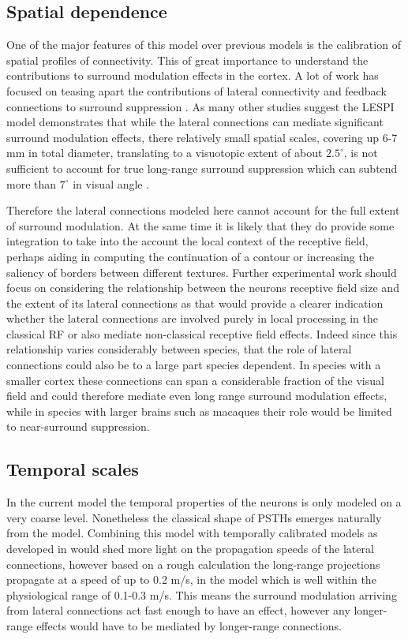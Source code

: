 \subsection{Spatial dependence}

One of the major features of this model over previous models is the
calibration of spatial profiles of connectivity. This of great
importance to understand the contributions to surround modulation
effects in the cortex. A lot of work has focused on teasing apart the
contributions of lateral connectivity and feedback connections to
surround suppression \citep{Angelucci2002, Bair2003, Schwabe2006}. As
many other studies suggest the LESPI model demonstrates that while the
lateral connections can mediate significant surround modulation
effects, there relatively small spatial scales, covering up 6-7 mm in
total diameter, translating to a visuotopic extent of about
$2.5^\circ$, is not sufficient to account for true long-range surround
suppression which can subtend more than $7^\circ$ in visual angle
\citep{Bair2003, Levitt2002}.

Therefore the lateral connections modeled here cannot account for the
full extent of surround modulation. At the same time it is likely that
they do provide some integration to take into the account the local
context of the receptive field, perhaps aiding in computing the
continuation of a contour or increasing the saliency of borders
between different textures. Further experimental work should focus on
considering the relationship between the neurons receptive field size
and the extent of its lateral connections as that would provide a
clearer indication whether the lateral connections are involved purely
in local processing in the classical RF or also mediate non-classical
receptive field effects. Indeed since this relationship varies
considerably between species, that the role of lateral connections
could also be to a large part species dependent. In species with a
smaller cortex these connections can span a considerable fraction of
the visual field and could therefore mediate even long range surround
modulation effects, while in species with larger brains such as
macaques their role would be limited to near-surround suppression.

\subsection{Temporal scales}

In the current model the temporal properties of the neurons is only
modeled on a very coarse level. Nonetheless the classical shape of
PSTHs emerges naturally from the model. Combining this model with
temporally calibrated models as developed in \citep{StevensPhD2016}
would shed more light on the propagation speeds of the lateral
connections, however based on a rough calculation the long-range
projections propagate at a speed of up to 0.2 m/s, in the model which
is well within the physiological range of 0.1-0.3 m/s. This means the
surround modulation arriving from lateral connections act fast enough
to have an effect, however any longer-range effects would have to be
mediated by longer-range connections.

